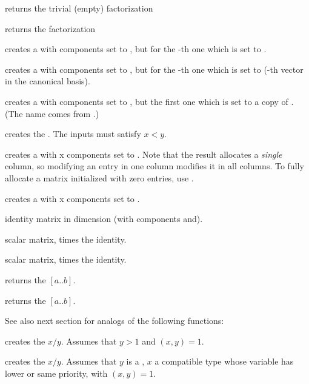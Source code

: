  returns the trivial (empty) factorization

 returns the factorization

 creates a  with 
components set to , but for the -th one which is set to
.

 creates a  with 
components set to , but for the -th one which is set to
 (-th vector in the canonical basis).

 creates a  with 
components set to , but the first one which is set to a copy
of . (The name comes from .)

\smallskip

 creates the  .
The inputs must satisfy $x < y$.

 creates a  with  x 
components set to . Note that the result allocates a
\emph{single} column, so modifying an entry in one column modifies it in
all columns. To fully allocate a matrix initialized with zero entries,
use .

 creates a  with  x
 components set to .

 identity matrix in dimension  (with
components  and).

 scalar matrix,  times the identity.

 scalar matrix,  times
the identity.

 returns the  $[a..b]$.

 returns the  $[a..b]$.

\smallskip
See also next section for analogs of the following functions:

 creates the  $x/y$. Assumes that
$y > 1$ and $(x,y) = 1$.

 creates the  $x/y$.
Assumes that $y$ is a , $x$ a compatible type whose variable has
lower or same priority, with $(x,y) = 1$.

